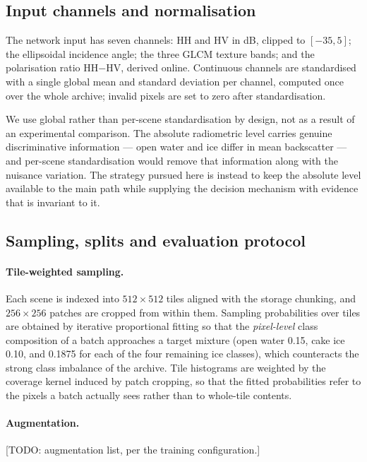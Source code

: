 \documentclass[preprint,12pt,authoryear]{elsarticle}
\begin{document}
\subsection{Input channels and normalisation}
\label{sec:channels}

The network input has seven channels: HH and HV in dB, clipped to
$[-35, 5]$; the ellipsoidal incidence angle; the three GLCM texture bands; and
the polarisation ratio HH$-$HV, derived online. Continuous channels are
standardised with a single global mean and standard deviation per channel,
computed once over the whole archive; invalid pixels are set to zero after
standardisation.

We use global rather than per-scene standardisation by design, not as a result
of an experimental comparison. The absolute radiometric level carries genuine
discriminative information --- open water and ice differ in mean backscatter ---
and per-scene standardisation would remove that information along with the
nuisance variation. The strategy pursued here is instead to keep the absolute
level available to the main path while supplying the decision mechanism with
evidence that is invariant to it.

\subsection{Sampling, splits and evaluation protocol}
\label{sec:splits}

\paragraph{Tile-weighted sampling.} Each scene is indexed into $512\times512$
tiles aligned with the storage chunking, and $256\times256$ patches are cropped
from within them. Sampling probabilities over tiles are obtained by iterative
proportional fitting \citep{deming1940leastsquares} so that the
\emph{pixel-level} class composition of a batch approaches a target mixture
(open water 0.15, cake ice 0.10, and 0.1875 for each of the four remaining ice
classes), which counteracts the strong class imbalance of the archive. Tile
histograms are weighted by the coverage kernel induced by patch cropping, so
that the fitted probabilities refer to the pixels a batch actually sees rather
than to whole-tile contents.

\paragraph{Augmentation.} [TODO: augmentation list, per the training
configuration.]
\end{document}
